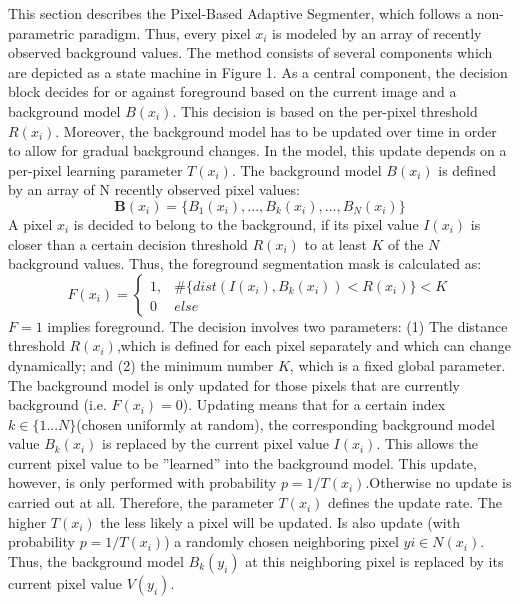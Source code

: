 This section describes the Pixel-Based Adaptive Segmenter, which follows a non-parametric paradigm. Thus,
every pixel $x_i$ is modeled by an array of recently observed background values. The method consists of several components which are depicted as a state machine in Figure 1. As a central component, the decision block decides for or against foreground
based on the current image and a background model $B(x_i)$. This decision is based on the per-pixel threshold $R(x_i)$. Moreover, the background model has to be updated over time in order to allow for gradual background changes. In the model, this update depends on a per-pixel learning parameter $T(x_i)$. \newline The background model $B(x_i)$ is defined by an array of N recently observed pixel values:
\begin{equation}
\mathbf{B}(x_i) = \{B_1(x_i),...,B_k(x_i),...,B_N(x_i)\}
\end{equation}
A pixel $x_i$ is decided to belong to the background, if its
pixel value $I(x_i) $ is closer than a certain decision threshold
$R(x_i)$ to at least $K$ of the $N$ background values. Thus,
the foreground segmentation mask is calculated as:
\begin{equation}
F(x_i) = \begin{cases} 1,& \#\{dist(I(x_i), B_k(x_i)) < R(x_i)\} < K \\0 &else\end{cases}
\end{equation}
$F = 1$ implies foreground. The decision involves two parameters: (1) The distance threshold $R(x_i)$,which is defined for each pixel separately and which can change dynamically; and (2) the minimum number $K$, which is a fixed global parameter.\newline
The background model is only updated for those pixels that
are currently background (i.e. $F(x_i) = 0$).
Updating means that for a certain index $k \in \{1...N \}$(chosen uniformly at random), the corresponding background model
value $B_k(x_i)$ is replaced by the current pixel value $I(x_i)$.
This allows the current pixel value to be ”learned” into
the background model. This update, however, is only performed with probability $p = 1/T(x_i)$.Otherwise no update
is carried out at all. Therefore, the parameter $T(x_i)$ defines
the update rate. The higher $T(x_i)$ the less likely a pixel
will be updated.
Is also update (with probability $p = 1/T(x_i)$) a randomly chosen neighboring pixel $y i \in N(x_i)$. Thus, the
background model $B_k(y_i)$ at this neighboring pixel is replaced by its current pixel value $V(y_i)$. \newline
